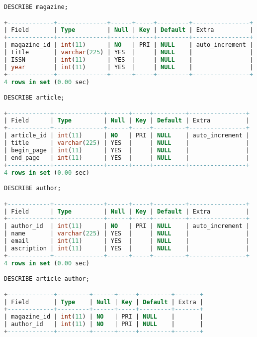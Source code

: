 \documentclass[12pt]{article}
\begin{document}
\begin{lstlisting}[language=SQL]
DESCRIBE magazine;

+-------------+--------------+------+-----+---------+----------------+
| Field       | Type         | Null | Key | Default | Extra          |
+-------------+--------------+------+-----+---------+----------------+
| magazine_id | int(11)      | NO   | PRI | NULL    | auto_increment |
| title       | varchar(225) | YES  |     | NULL    |                |
| ISSN        | int(11)      | YES  |     | NULL    |                |
| year        | int(11)      | YES  |     | NULL    |                |
+-------------+--------------+------+-----+---------+----------------+
4 rows in set (0.00 sec)

DESCRIBE article;

+------------+--------------+------+-----+---------+----------------+
| Field      | Type         | Null | Key | Default | Extra          |
+------------+--------------+------+-----+---------+----------------+
| article_id | int(11)      | NO   | PRI | NULL    | auto_increment |
| title      | varchar(225) | YES  |     | NULL    |                |
| begin_page | int(11)      | YES  |     | NULL    |                |
| end_page   | int(11)      | YES  |     | NULL    |                |
+------------+--------------+------+-----+---------+----------------+
4 rows in set (0.00 sec)

DESCRIBE author;

+------------+--------------+------+-----+---------+----------------+
| Field      | Type         | Null | Key | Default | Extra          |
+------------+--------------+------+-----+---------+----------------+
| author_id  | int(11)      | NO   | PRI | NULL    | auto_increment |
| name       | varchar(225) | YES  |     | NULL    |                |
| email      | int(11)      | YES  |     | NULL    |                |
| ascription | int(11)      | YES  |     | NULL    |                |
+------------+--------------+------+-----+---------+----------------+
4 rows in set (0.00 sec)

DESCRIBE article-author;

+-------------+---------+------+-----+---------+-------+
| Field       | Type    | Null | Key | Default | Extra |
+-------------+---------+------+-----+---------+-------+
| magazine_id | int(11) | NO   | PRI | NULL    |       |
| author_id   | int(11) | NO   | PRI | NULL    |       |
+-------------+---------+------+-----+---------+-------+
\end{lstlisting}

\end{document}
